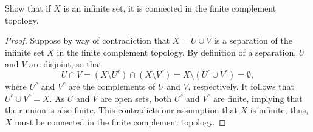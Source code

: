 \begin{exercise}[ID=3.23.4]
  Show that if $X$ is an infinite set, it is connected in the finite complement topology.
\end{exercise}
%
\begin{solution}
  \begin{proof}
    Suppose by way of contradiction that $X = U \cup V$ is a separation of the infinite set $X$ in the finite complement topology.
    By definition of a separation, $U$ and $V$ are disjoint, so that
    \begin{equation*}
      U \cap V = (X \setminus U^c) \cap (X \setminus V^c) = X \setminus (U^c \cup V^c) = \emptyset,
    \end{equation*}
    where $U^c$ and $V^c$ are the complements of $U$ and $V$, respectively.
    It follows that $U^c \cup V^c = X$.
    As $U$ and $V$ are open sets, both $U^c$ and $V^c$ are finite, implying that their union is also finite.
    This contradicts our assumption that $X$ is infinite, thus, $X$ must be connected in the finite complement topology.
  \end{proof}
\end{solution}
\newpage

